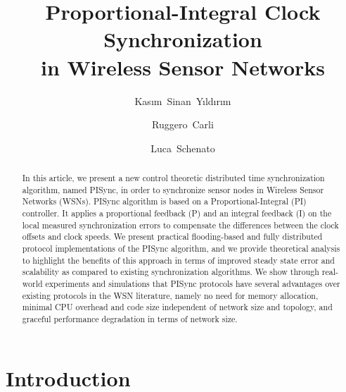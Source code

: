 \documentclass[english,a4paper,10pt,final]{article}
\date{}
\numberwithin{equation}{section}
\numberwithin{figure}{section}
\begin{document}
\title{\bf Proportional-Integral Clock Synchronization \\ in Wireless Sensor Networks}

\author[1]{Kasım~Sinan~Yıldırım}
\author[2]{Ruggero~Carli}
\author[2]{Luca~Schenato}

\maketitle

\begin{abstract}
In this article, we present a new control theoretic distributed time synchronization algorithm, named PISync, in order to synchronize sensor nodes in Wireless Sensor Networks (WSNs). PISync algorithm is based on a Proportional-Integral (PI) controller. It applies a proportional feedback (P) and an integral feedback (I) on the local measured synchronization errors to compensate the differences between the clock offsets and clock speeds. We present practical flooding-based and fully distributed protocol implementations of the PISync algorithm, and we provide theoretical analysis to highlight the benefits of this approach in terms of improved steady state error and scalability as compared to existing synchronization algorithms. We show through real-world experiments and simulations that PISync protocols have several advantages over existing protocols in the WSN literature, namely no need for memory allocation, minimal CPU overhead and code size independent of network size and topology, and graceful performance degradation in terms of network size.
\end{abstract}

\maketitle

\section{Introduction}
\end{document}
